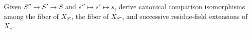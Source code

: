 \begin{problem}\label{chall:vi25-04}
Given $S''\to S'\to S$ and $s''\mapsto s'\mapsto s$, derive canonical comparison isomorphisms among the fiber of $X_{S'}$, the fiber of $X_{S''}$, and successive residue-field extensions of $X_s$.
\end{problem}
